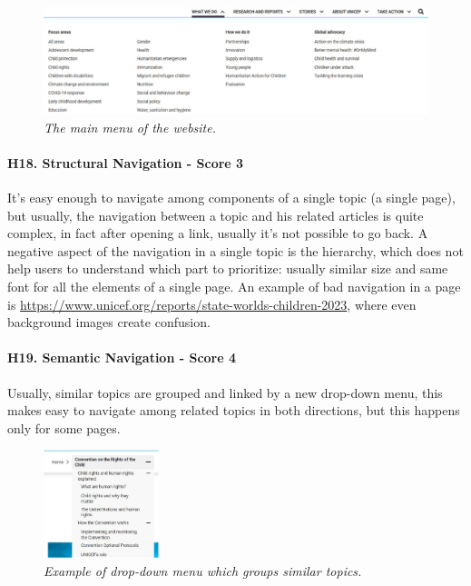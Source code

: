 \begin{figure}[!h]
	\begin{center}
		\includegraphics[width=\textwidth]{FinalScores20.jpg}
		\captionsetup{font=small}
		\caption{\textit{The main menu of the website.}}
	\end{center}
\end{figure}
\newline
\newline \paragraph{H18. Structural Navigation - Score 3}	It’s easy enough to navigate among components of a single topic (a single page), but usually, the navigation between a topic and his related articles is quite complex, in fact after opening a link, usually it’s not possible to go back.
\newline A negative aspect of the navigation in a single topic is the hierarchy, which does not help users to understand which part to prioritize: usually similar size and same font for all the elements of a single page.
\newline An example of bad navigation in a page is \href{https://www.unicef.org/reports/state-worlds-children-2023}{https://www.unicef.org/reports/state-worlds-children-2023}, where even background images create confusion.
\newline
\newline \paragraph{H19. Semantic Navigation - Score 4}	Usually, similar topics are grouped and linked by a new drop-down menu, this makes easy to navigate among related topics in both directions, but this happens only for some pages.
\begin{figure}[!h]
	\begin{center}
		\includegraphics[width=0.3\textwidth]{FinalScores21.jpg}
		\captionsetup{font=small}
		\caption{\textit{Example of drop-down menu which groups similar topics.}}
	\end{center}
\end{figure}
